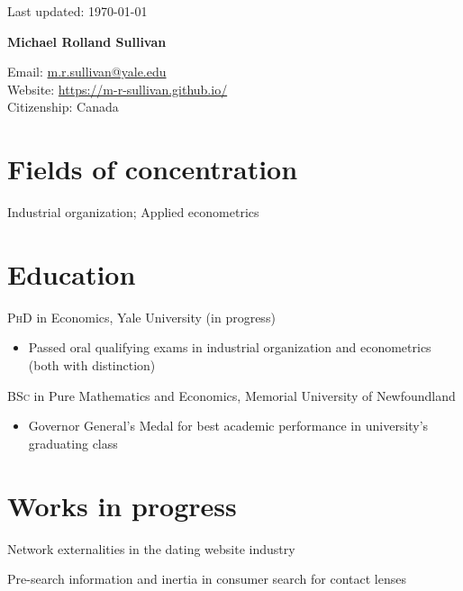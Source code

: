 \documentclass[11pt]{article} %
\begin{document}
 \begin{flushright}
   \scriptsize
	Last updated: \today
   \normalsize
\end{flushright}
{\LARGE\bfseries Michael Rolland Sullivan} %
\bigskip\bigskip\medskip %

\medskip %

Email: \href{mailto:m.r.sullivan@yale.edu}{m.r.sullivan@yale.edu}\\ 
Website: \href{https://m-r-sullivan.github.io/}{https://m-r-sullivan.github.io/}\\ 

Citizenship: Canada 

\section*{Fields of concentration}

Industrial organization; Applied econometrics 

\section*{Education}

\textsc{PhD} in Economics, Yale University (in progress)
\begin{itemize}
	\item Passed oral qualifying exams in industrial organization and econometrics (both with distinction)
\end{itemize}

\textsc{BSc} in Pure Mathematics and Economics, Memorial University of Newfoundland
\begin{itemize}
	\item Governor General's Medal for best academic performance in university's graduating class
\end{itemize}

\section*{Works in progress}

Network externalities in the dating website industry

Pre-search information and inertia in consumer search for contact lenses
\end{document}
